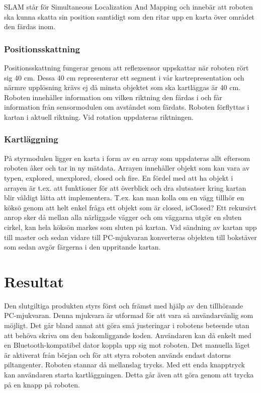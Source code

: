\documentclass[a4paper,12pt,fleqn]{article}
\begin{document}
SLAM står för Simultaneous Localization And Mapping och innebär att roboten ska kunna skatta sin position samtidigt som den ritar upp en karta över området den färdas inom.

\subsubsection{Positionsskattning}
Positionsskattning fungerar genom att reflexsensor uppskattar när roboten rört sig 40 cm. Dessa 40 cm representerar ett segment i vår kartrepresentation och närmre upplösning krävs ej då minsta objektet som ska kartläggas är 40 cm. Roboten innehåller information om vilken riktning den färdas i och får information från sensormodulen om avståndet som färdats. Roboten förflyttas i kartan i aktuell riktning. Vid rotation uppdateras riktningen. 

\subsubsection{Kartläggning}
På styrmodulen ligger en karta i form av en array som uppdateras allt eftersom roboten åker och tar in ny mätdata. Arrayen innehåller objekt som kan vara av typen, explored, unexplored, closed och fire. En fördel med att ha objekt i arrayen är t.ex. att funktioner för att överblick och dra slutsatser kring kartan blir väldigt lätta att implementera. T.ex. kan man kolla om en vägg tillhör en köksö genom att helt enkel fråga ett objekt som är closed, isClosed? Ett rekursivt anrop sker då mellan alla närliggade vägger och om väggarna utgör en sluten cirkel, kan hela köksön markes som sluten på kartan. 
Vid sändning av kartan upp till master och sedan vidare till PC-mjukvaran konverteras objekten till bokstäver som sedan avgör färgerna i den uppritande kartan.  


\section{Resultat}

Den slutgiltiga produkten styrs först och främst med hjälp av den tillhörande PC-mjukvaran. Denna mjukvara är utformad för att vara så användarvänlig som möjligt. Det går bland annat att göra små justeringar i robotens beteende utan att behöva skriva om den bakomliggande koden. Användaren kan då enkelt med en Bluetooth-kompatibel dator koppla upp sig mot roboten. Det manuella läget är aktiverat från början och för att styra roboten används endast datorns piltangenter. Roboten stannar då mellanslag trycks. Med ett enda knapptryck kan användaren starta kartläggningen. Detta går även att göra genom att trycka på en knapp på roboten.
\end{document}
